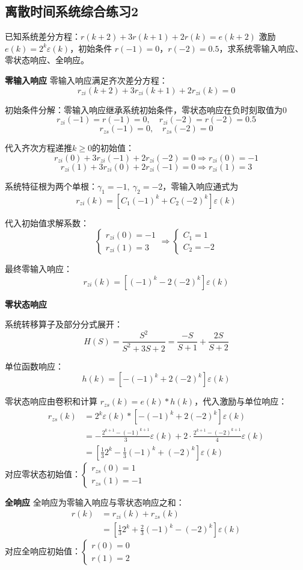 \documentclass[UTF8]{ctexart}
\begin{document}
\subsection{离散时间系统综合练习2}

\begin{problem}
已知系统差分方程：$r(k+2)+3 r(k+1)+2 r(k)=e(k+2)$
激励 $e(k)=2^{k} \varepsilon(k)$，初始条件 $r(-1)=0$，$r(-2)=0.5$，求系统零输入响应、零状态响应、全响应。
\end{problem}

\begin{solution}
\textbf{零输入响应}
零输入响应满足齐次差分方程：
$$
r_{zi}(k+2)+3 r_{zi}(k+1)+2 r_{zi}(k)=0
$$

初始条件分解：零输入响应继承系统初始条件，零状态响应在负时刻取值为0
$$
r_{zi}(-1)=r(-1)=0,\quad r_{zi}(-2)=r(-2)=0.5
$$
$$
r_{zs}(-1)=0,\quad r_{zs}(-2)=0
$$

代入齐次方程递推$k \geq 0$的初始值：
$$
r_{zi}(0)+3 r_{zi}(-1)+2 r_{zi}(-2)=0 \Rightarrow r_{zi}(0)=-1
$$
$$
r_{zi}(1)+3 r_{zi}(0)+2 r_{zi}(-1)=0 \Rightarrow r_{zi}(1)=3
$$

系统特征根为两个单根：$\gamma_{1}=-1,\ \gamma_{2}=-2$，零输入响应通式为
$$
r_{zi}(k)=\left[C_{1}(-1)^{k}+C_{2}(-2)^{k}\right] \varepsilon(k)
$$

代入初始值求解系数：
$$
\left\{
\begin{array}{c}
r_{zi}(0) = -1 \\
r_{zi}(1) = 3
\end{array}
\right.
\Rightarrow
\left\{
\begin{array}{c}
C_{1}=1 \\
C_{2}=-2
\end{array}
\right.
$$

最终零输入响应：
$$
r_{zi}(k)=\left[(-1)^{k}-2(-2)^{k}\right] \varepsilon(k)
$$

\textbf{零状态响应}

系统转移算子及部分分式展开：
$$
H(S)=\frac{S^{2}}{S^{2}+3 S+2}=\frac{-S}{S+1}+\frac{2 S}{S+2}
$$

单位函数响应：
$$
h(k)=\left[-(-1)^{k}+2(-2)^{k}\right] \varepsilon(k)
$$

零状态响应由卷积和计算 $r_{zs}(k)=e(k) * h(k)$，代入激励与单位响应：
$$
\begin{aligned}
r_{zs}(k) &=2^{k} \varepsilon(k) *\left[-(-1)^{k}+2(-2)^{k}\right] \varepsilon(k) \\
&=-\frac{2^{k+1}-(-1)^{k+1}}{3} \varepsilon(k)+2 \cdot\frac{2^{k+1}-(-2)^{k+1}}{4} \varepsilon(k) \\
&=\left[\frac{1}{3} 2^{k}-\frac{1}{3}(-1)^{k}+(-2)^{k}\right] \varepsilon(k)
\end{aligned}
$$
对应零状态初始值：$\begin{cases} r_{zs}(0)=1 \\ r_{zs}(1)=-1 \end{cases}$

\textbf{全响应}
全响应为零输入响应与零状态响应之和：
$$
\begin{aligned}
r(k) &=r_{zi}(k)+r_{zs}(k) \\
&=\left[\frac{1}{3} 2^{k}+\frac{2}{3}(-1)^{k}-(-2)^{k}\right] \varepsilon(k)
\end{aligned}
$$
对应全响应初始值：$\begin{cases} r(0)=0 \\ r(1)=2 \end{cases}$
\end{solution}
\end{document}
